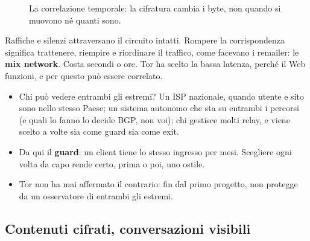 \begin{figure}[H]
\centering
{}
\caption{La correlazione temporale: la cifratura cambia i byte, non quando si muovono né quanti sono.}
\end{figure}

Raffiche e silenzi attraversano il circuito intatti. Rompere la corrispondenza significa trattenere, riempire e riordinare il traffico,
come facevano i remailer: le \textbf{mix network}. Costa secondi o ore. Tor ha scelto la bassa latenza, perché il Web funzioni, e per
questo può essere correlato.

\begin{itemize}
    \item Chi può vedere entrambi gli estremi? Un ISP nazionale, quando utente e sito sono nello stesso Paese; un sistema autonomo che sta
          su entrambi i percorsi (e quali lo fanno lo decide BGP, non voi); chi gestisce molti relay, e viene scelto a volte sia come
          guard sia come exit.
    \item Da qui il \textbf{guard}: un client tiene lo stesso ingresso per mesi. Scegliere ogni volta da capo rende certo, prima o poi,
          uno ostile.
    \item Tor non ha mai affermato il contrario: fin dal primo progetto, non protegge da un osservatore di entrambi gli estremi.
\end{itemize}

\subsection{Contenuti cifrati, conversazioni visibili}

